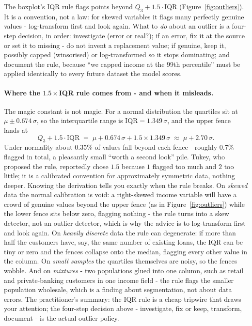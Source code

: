 \documentclass[11pt,a4paper]{article}
\begin{document}
The boxplot's IQR rule flags points beyond $Q_3 + 1.5\cdot\mathrm{IQR}$
(Figure~\ref{fig:outliers}). It is a convention, not a law: for skewed
variables it flags many perfectly genuine values - log-transform first and
look again. What to \emph{do} about an outlier is a four-step decision, in
order: investigate (error or real?); if an error, fix it at the source or
set it to missing - do not invent a replacement value; if genuine, keep it,
possibly capped (winsorised) or log-transformed so it stops dominating; and
document the rule, because ``we capped income at the 99th percentile'' must
be applied identically to every future dataset the model scores.

\paragraph{Where the $1.5 \times$IQR rule comes from - and when it
misleads.} The magic constant is not magic. For a normal distribution the
quartiles sit at $\mu \pm 0.674\,\sigma$, so the interquartile range is
$\mathrm{IQR} = 1.349\,\sigma$, and the upper fence lands at
\[
Q_3 + 1.5\cdot\mathrm{IQR}
\;=\; \mu + 0.674\,\sigma + 1.5 \times 1.349\,\sigma
\;\approx\; \mu + 2.70\,\sigma .
\]
Under normality about $0.35\%$ of values fall beyond each fence - roughly
$0.7\%$ flagged in total, a pleasantly small ``worth a second look'' pile.
Tukey, who proposed the rule, reportedly chose $1.5$ because $1$ flagged
too much and $2$ too little; it is a calibrated convention for
approximately symmetric data, nothing deeper. Knowing the derivation tells
you exactly when the rule breaks. On \emph{skewed} data the normal
calibration is void: a right-skewed income variable will have a crowd of
genuine values beyond the upper fence (as in
Figure~\ref{fig:outliers}) while the lower fence sits below zero,
flagging nothing - the rule turns into a skew detector, not an outlier
detector, which is why the advice is to log-transform first and look
again. On \emph{heavily discrete} data the rule can degenerate: if more
than half the customers have, say, the same number of existing loans, the
IQR can be tiny or zero and the fences collapse onto the median, flagging
every other value in the column. On \emph{small samples} the quartiles
themselves are noisy, so the fences wobble. And on \emph{mixtures} - two
populations glued into one column, such as retail and private-banking
customers in one income field - the rule flags the smaller population
wholesale, which is a finding about segmentation, not about data errors.
The practitioner's summary: the IQR rule is a cheap tripwire that draws
your attention; the four-step decision above - investigate, fix or keep,
transform, document - is the actual outlier policy.
\end{document}
